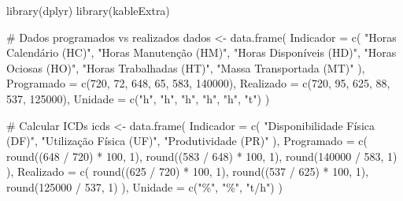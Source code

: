\documentclass[
  letterpaper,
]{book}
\newenvironment{Shaded}{\begin{snugshade}}{\end{snugshade}}
\newcommand{\AttributeTok}[1]{\textcolor[rgb]{0.40,0.45,0.13}{#1}}
\newcommand{\CommentTok}[1]{\textcolor[rgb]{0.37,0.37,0.37}{#1}}
\newcommand{\DecValTok}[1]{\textcolor[rgb]{0.68,0.00,0.00}{#1}}
\newcommand{\FunctionTok}[1]{\textcolor[rgb]{0.28,0.35,0.67}{#1}}
\newcommand{\NormalTok}[1]{\textcolor[rgb]{0.00,0.23,0.31}{#1}}
\newcommand{\OtherTok}[1]{\textcolor[rgb]{0.00,0.23,0.31}{#1}}
\newcommand{\SpecialCharTok}[1]{\textcolor[rgb]{0.37,0.37,0.37}{#1}}
\newcommand{\StringTok}[1]{\textcolor[rgb]{0.13,0.47,0.30}{#1}}
\begin{document}
\begin{Shaded}
\begin{Highlighting}[]
\FunctionTok{library}\NormalTok{(dplyr)}
\FunctionTok{library}\NormalTok{(kableExtra)}

\CommentTok{\# Dados programados vs realizados}
\NormalTok{dados }\OtherTok{\textless{}{-}} \FunctionTok{data.frame}\NormalTok{(}
    \AttributeTok{Indicador =} \FunctionTok{c}\NormalTok{(}
        \StringTok{"Horas Calendário (HC)"}\NormalTok{, }\StringTok{"Horas Manutenção (HM)"}\NormalTok{,}
        \StringTok{"Horas Disponíveis (HD)"}\NormalTok{, }\StringTok{"Horas Ociosas (HO)"}\NormalTok{,}
        \StringTok{"Horas Trabalhadas (HT)"}\NormalTok{, }\StringTok{"Massa Transportada (MT)"}
\NormalTok{    ),}
    \AttributeTok{Programado =} \FunctionTok{c}\NormalTok{(}\DecValTok{720}\NormalTok{, }\DecValTok{72}\NormalTok{, }\DecValTok{648}\NormalTok{, }\DecValTok{65}\NormalTok{, }\DecValTok{583}\NormalTok{, }\DecValTok{140000}\NormalTok{),}
    \AttributeTok{Realizado =} \FunctionTok{c}\NormalTok{(}\DecValTok{720}\NormalTok{, }\DecValTok{95}\NormalTok{, }\DecValTok{625}\NormalTok{, }\DecValTok{88}\NormalTok{, }\DecValTok{537}\NormalTok{, }\DecValTok{125000}\NormalTok{),}
    \AttributeTok{Unidade =} \FunctionTok{c}\NormalTok{(}\StringTok{"h"}\NormalTok{, }\StringTok{"h"}\NormalTok{, }\StringTok{"h"}\NormalTok{, }\StringTok{"h"}\NormalTok{, }\StringTok{"h"}\NormalTok{, }\StringTok{"t"}\NormalTok{)}
\NormalTok{)}

\CommentTok{\# Calcular ICDs}
\NormalTok{icds }\OtherTok{\textless{}{-}} \FunctionTok{data.frame}\NormalTok{(}
    \AttributeTok{Indicador =} \FunctionTok{c}\NormalTok{(}
        \StringTok{"Disponibilidade Física (DF)"}\NormalTok{,}
        \StringTok{"Utilização Física (UF)"}\NormalTok{,}
        \StringTok{"Produtividade (PR)"}
\NormalTok{    ),}
    \AttributeTok{Programado =} \FunctionTok{c}\NormalTok{(}
        \FunctionTok{round}\NormalTok{((}\DecValTok{648} \SpecialCharTok{/} \DecValTok{720}\NormalTok{) }\SpecialCharTok{*} \DecValTok{100}\NormalTok{, }\DecValTok{1}\NormalTok{),}
        \FunctionTok{round}\NormalTok{((}\DecValTok{583} \SpecialCharTok{/} \DecValTok{648}\NormalTok{) }\SpecialCharTok{*} \DecValTok{100}\NormalTok{, }\DecValTok{1}\NormalTok{),}
        \FunctionTok{round}\NormalTok{(}\DecValTok{140000} \SpecialCharTok{/} \DecValTok{583}\NormalTok{, }\DecValTok{1}\NormalTok{)}
\NormalTok{    ),}
    \AttributeTok{Realizado =} \FunctionTok{c}\NormalTok{(}
        \FunctionTok{round}\NormalTok{((}\DecValTok{625} \SpecialCharTok{/} \DecValTok{720}\NormalTok{) }\SpecialCharTok{*} \DecValTok{100}\NormalTok{, }\DecValTok{1}\NormalTok{),}
        \FunctionTok{round}\NormalTok{((}\DecValTok{537} \SpecialCharTok{/} \DecValTok{625}\NormalTok{) }\SpecialCharTok{*} \DecValTok{100}\NormalTok{, }\DecValTok{1}\NormalTok{),}
        \FunctionTok{round}\NormalTok{(}\DecValTok{125000} \SpecialCharTok{/} \DecValTok{537}\NormalTok{, }\DecValTok{1}\NormalTok{)}
\NormalTok{    ),}
    \AttributeTok{Unidade =} \FunctionTok{c}\NormalTok{(}\StringTok{"\%"}\NormalTok{, }\StringTok{"\%"}\NormalTok{, }\StringTok{"t/h"}\NormalTok{)}
\NormalTok{)}


\end{Highlighting}
\end{Shaded}
\end{document}
